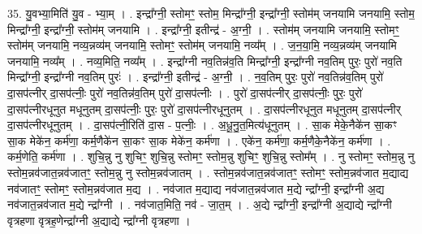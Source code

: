 \documentclass[17pt]{extarticle}
\begin{document}
35. यु॒वभ्या॒मिति॑ यु॒व - भ्या॒म् । . इन्द्रा᳚ग्नी॒ स्तोमꣳ॒॒ स्तोम॒ मिन्द्रा᳚ग्नी॒ इन्द्रा᳚ग्नी॒ स्तोम॑म् जनयामि जनयामि॒ स्तोम॒ मिन्द्रा᳚ग्नी॒ इन्द्रा᳚ग्नी॒ स्तोम॑म् जनयामि । . इन्द्रा᳚ग्नी॒ इतीन्द्र॑ - अ॒ग्नी॒ । . स्तोम॑म् जनयामि जनयामि॒ स्तोमꣳ॒॒ स्तोम॑म् जनयामि॒ नव्य॒न्नव्य॑म् जनयामि॒ स्तोमꣳ॒॒ स्तोम॑म् जनयामि॒ नव्य᳚म् । . ज॒न॒या॒मि॒ नव्य॒न्नव्य॑म् जनयामि जनयामि॒ नव्य᳚म् । . नव्य॒मिति॒ नव्य᳚म् । . इन्द्रा᳚ग्नी नव॒तिन्न॑व॒ति मिन्द्रा᳚ग्नी॒ इन्द्रा᳚ग्नी नव॒तिम् पुरः॒ पुरो॑ नव॒ति मिन्द्रा᳚ग्नी॒ इन्द्रा᳚ग्नी नव॒तिम् पुरः॑ । . इन्द्रा᳚ग्नी॒ इतीन्द्र॑ - अ॒ग्नी॒ । . न॒व॒तिम् पुरः॒ पुरो॑ नव॒तिन्न॑व॒तिम् पुरो॑ दा॒सप॑त्नीर् दा॒सप॑त्नीः॒ पुरो॑ नव॒तिन्न॑व॒तिम् पुरो॑ दा॒सप॑त्नीः । . पुरो॑ दा॒सप॑त्नीर् दा॒सप॑त्नीः॒ पुरः॒ पुरो॑ दा॒सप॑त्नीरधूनुत मधूनुतम् दा॒सप॑त्नीः॒ पुरः॒ पुरो॑ दा॒सप॑त्नीरधूनुतम् । . दा॒सप॑त्नीरधूनुत मधूनुतम् दा॒सप॑त्नीर् दा॒सप॑त्नीरधूनुतम् । . दा॒सप॑त्नी॒रिति॑ दा॒स - प॒त्नीः॒ । . अ॒धू॒नु॒त॒मित्य॑धूनुतम् । . सा॒क मेके॒नैके॑न सा॒कꣳ सा॒क मेके॑न॒ कर्म॑णा॒ कर्म॒णैके॑न सा॒कꣳ सा॒क मेके॑न॒ कर्म॑णा । . एके॑न॒ कर्म॑णा॒ कर्म॒णैके॒नैके॑न॒ कर्म॑णा । . कर्म॒णेति॒ कर्म॑णा । . शुचि॒न्नु नु शुचिꣳ॒॒ शुचि॒न्नु स्तोमꣳ॒॒ स्तोम॒न्नु शुचिꣳ॒॒ शुचि॒न्नु स्तोम᳚म् । . नु स्तोमꣳ॒॒ स्तोम॒न्नु नु स्तोम॒न्नव॑जात॒न्नव॑जातꣳ॒॒ स्तोम॒न्नु नु स्तोम॒न्नव॑जातम् । . स्तोम॒न्नव॑जात॒न्नव॑जातꣳ॒॒ स्तोमꣳ॒॒ स्तोम॒न्नव॑जात म॒द्याद्य नव॑जातꣳ॒॒ स्तोमꣳ॒॒ स्तोम॒न्नव॑जात म॒द्य । . नव॑जात म॒द्याद्य नव॑जात॒न्नव॑जात म॒द्ये न्द्रा᳚ग्नी॒ इन्द्रा᳚ग्नी अ॒द्य नव॑जात॒न्नव॑जात म॒द्ये न्द्रा᳚ग्नी । . नव॑जात॒मिति॒ नव॑ - जा॒त॒म् । . अ॒द्ये न्द्रा᳚ग्नी॒ इन्द्रा᳚ग्नी अ॒द्याद्ये न्द्रा᳚ग्नी वृत्रहणा वृत्रह॒णेन्द्रा᳚ग्नी अ॒द्याद्ये न्द्रा᳚ग्नी वृत्रहणा । \newline
\end{document}
